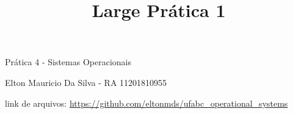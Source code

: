 




\frenchspacing 

\textual

	

	\title{Large Prática 1}	
		Prática 4 - Sistemas Operacionais	
		
		Elton Mauricio Da Silva - RA 11201810955

		link de arquivos: \url{https://github.com/eltonmds/ufabc_operational_systems}
	
	



\printindex


